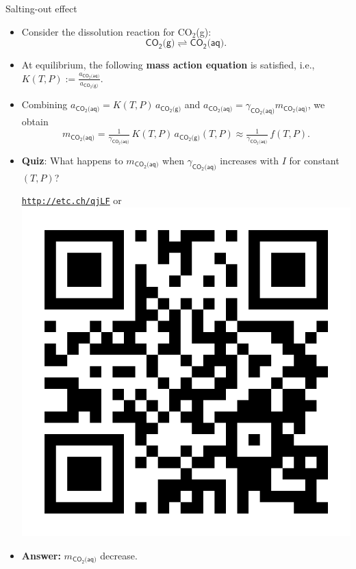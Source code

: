 \begin{frame}[<+->]{Salting-out effect}

\small
\begin{itemize}
\item Consider the dissolution reaction for CO$_{2}$(g):
\[
\mathsf{CO_{2}\text{(g)}}\rightleftharpoons\mathsf{CO_{2}\text{(aq)}}.
\]
\item At equilibrium, the following \textbf{mass action equation} is satisfied, i.e., 
%
$K(T, P) := \tfrac{a_{\mathsf{CO_{2}\text{(aq)}}}}{a_{\mathsf{CO_{2}\text{(g)}}}}$.
\item Combining $a_{\mathsf{CO_{2}\text{(aq)}}} = K(T, P) \, a_{\mathsf{CO_{2}\text{(g)}}}$ and 
$a_{\mathsf{CO_{2}\text{(aq)}}}=\gamma_{\mathsf{CO_{2}\text{(aq)}}}m_{\mathsf{CO_{2}\text{(aq)}}}$, we obtain 
\[
m_{\mathsf{CO_{2}\text{(aq)}}}=\tfrac{1}{\gamma_{\mathsf{CO_{2}\text{(aq)}}}} \, K(T, P) \, a_{\mathsf{CO_{2}\text{(g)}}}(T, P)
\approx \tfrac{1}{\gamma_{\mathsf{CO_{2}\text{(aq)}}}} \, f(T, P).
\]
\item \alert{\textbf{Quiz}}: What happens to $m_{\mathsf{CO_{2}\text{(aq)}}}$ when $\gamma_{\mathsf{CO_{2}\text{(aq)}}}$
increases with $I$ for constant $(T, P)$?
\begin{center}
	\href{http://etc.ch/qjLF}{\textcolor{indigo(dye)}{\tt http://etc.ch/qjLF}} \quad or \quad 
	\includegraphics[height=0.14\columnwidth]{figures/activity-models/poll-ionic-strength.png}
\end{center}
\hiddenpause
\item \textbf{Answer:} $m_{\mathsf{CO_{2}\text{(aq)}}}$ decrease. 
\end{itemize}
\end{frame}
%
%
